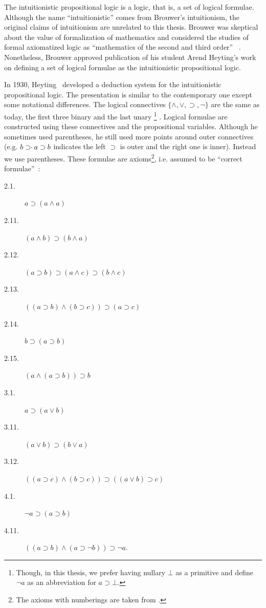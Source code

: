 The intuitionistic propositional logic is a logic, that is, a set of
logical formulae.
Although the name ``intuitionistic'' comes from Brouwer's
intuitionism,
the original claims of intuitionism are unrelated to this thesis.
Brouwer was skeptical about the value of formalization of
mathematics and considered the studies of formal axiomatized logic as
``mathematics of the second and third order''%
~\citep[p.~10]{stigt1998}.
Nonetheless, Brouwer approved publication of his student Arend Heyting's
work on defining a set of logical formulae as the intuitionistic
propositional logic.

In 1930, Heyting~\cite{heyting1930} developed a deduction
system for the
intuitionistic propositional logic.  The presentation is similar to
the contemporary one except some notational differences.  The
logical connectives  $\{\wedge,\vee,\supset,\neg\}$
are the same as today, the
first three binary and the last unary%
\footnote{Though, in this thesis, we prefer having nullary $\bot$ as a
primitive and define $\neg a$ as an abbreviation for $a\supset\bot$.}%
.  Logical formulae are constructed
using these connectives and the propositional variables.
Although he sometimes used parentheses, he still used more points
around outer connectives (e.g. $b\supset \kern -3pt\cdot \kern 2pt  a
\supset b$ indicates the left $\supset$ is outer and the right one is
inner).  Instead we use parentheses.
These formulae are axioms\footnote{The axioms with numberings are taken
from \citet{heyting1930}.}, i.e. assumed to be
``correct formulae''~\cite{heyting1930}:
\begin{description}
 \item[2.1.] $a\supset (a\land a)$
 \item[2.11.] $(a\land b)\supset (b\land a)$
 \item[2.12.] $(a\supset b)\supset (a\land c)\supset (b\land c)$
 \item[2.13.] $((a\supset b)\land (b\supset c))\supset (a\supset c)$
 \item[2.14.] $b\supset (a\supset b)$
 \item[2.15.] $(a\land (a\supset b))\supset b$
 \item[3.1.] $a\supset (a\lor b)$
 \item[3.11.] $(a\lor b)\supset (b\lor a)$
 \item[3.12.] $((a\supset c)\land(b\supset c))\supset ((a\lor b)\supset
      c)$
 \item[4.1.] $\neg a\supset (a\supset b)$
 \item[4.11.] $((a\supset b)\land (a\supset \neg b)) \supset \neg a$\enspace.
\end{description}
